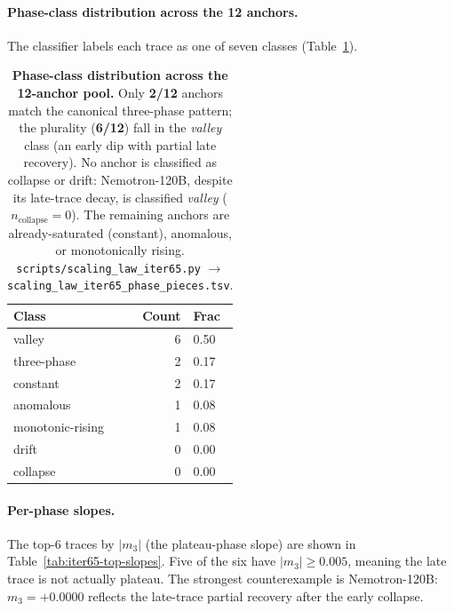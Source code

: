 \documentclass{article}
\providecommand{\tableref}[1]{Table~\ref{#1}}
\begin{document}
\paragraph{Phase-class distribution across the 12 anchors.}
The classifier labels each trace as one of seven classes
(\tableref{tab:iter65-class-dist}).

\begin{table}[t]
  \centering
  \small
  \begin{tabular}{lrl}
    \toprule
    Class & Count & Frac \\
    \midrule
    valley & 6 & 0.50 \\
    three-phase & 2 & 0.17 \\
    constant & 2 & 0.17 \\
    anomalous & 1 & 0.08 \\
    monotonic-rising & 1 & 0.08 \\
    drift & 0 & 0.00 \\
    collapse & 0 & 0.00 \\
    \bottomrule
  \end{tabular}
  \caption{\textbf{Phase-class distribution across the 12-anchor
    pool.}  Only \textbf{2/12}
    anchors match the canonical three-phase pattern; the plurality
    (\textbf{6/12}) fall in the \emph{valley} class (an early dip with
    partial late recovery).  No anchor is classified as collapse or
    drift: Nemotron-120B, despite its late-trace decay, is classified
    \emph{valley} ($n_{\text{collapse}}=0$).  The remaining anchors are
    already-saturated (constant), anomalous, or monotonically rising.
    \texttt{scripts/scaling\_law\_iter65.py}
    $\to$ \texttt{scaling\_law\_iter65\_phase\_pieces.tsv}.}
  \label{tab:iter65-class-dist}
\end{table}

\paragraph{Per-phase slopes.}
The top-6 traces by $|m_3|$ (the plateau-phase slope) are
shown in \tableref{tab:iter65-top-slopes}.  Five of the six
have $|m_3| \geq 0.005$, meaning the late trace is not actually
plateau.  The strongest counterexample is Nemotron-120B:
$m_3 = +0.0000$ reflects
the late-trace partial recovery after the early collapse.
\end{document}
